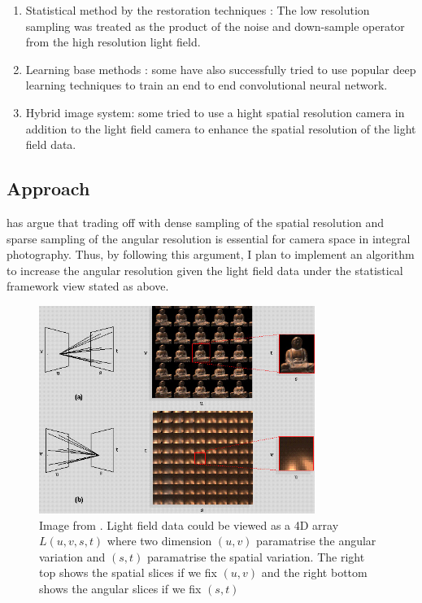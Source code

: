 \documentclass[11pt]{article}
\begin{document}
\begin{enumerate}

  \item Statistical method by the restoration techniques\cite{mitra2012light}
    \cite{wanner2014variational} \cite{rossi2017graph} : The low resolution
    sampling was treated as the product of the noise and down-sample operator
    from the high resolution light field.

  \item Learning base methods\cite{yoon2017light} \cite{gul2017spatial}: some
    have also successfully tried to use popular deep learning techniques to train
    an end to end convolutional neural network.

  \item Hybrid image system\cite{boominathan2014improving}: some tried to use
    a hight spatial resolution camera in addition to the light field camera to
    enhance the spatial resolution of the light field data.

\end{enumerate}

\subsection*{Approach}


\cite{georgiev2006spatio} has argue that trading off with dense sampling of the
spatial resolution and sparse sampling of the angular resolution is essential
for camera space in integral photography. Thus, by following this argument, I
plan to implement an algorithm to increase the angular resolution given the
light field data under the statistical framework view stated as above.

\begin{figure}[t]
  \centering
  \captionsetup{width=0.8\linewidth}
  \includegraphics[width=0.8\textwidth]{./light-field-slice.jpg}
  \caption{
    Image from \cite{levoy1996light}. Light field data could be viewed as a 4D
    array $L(u, v, s, t)$ where two dimension $(u, v)$ paramatrise the angular
    variation and $(s, t)$ paramatrise the spatial variation. The right top shows
    the spatial slices if we fix $(u, v)$ and the right bottom shows the angular
    slices if we fix $(s, t)$
  }
\end{figure}
\end{document}
